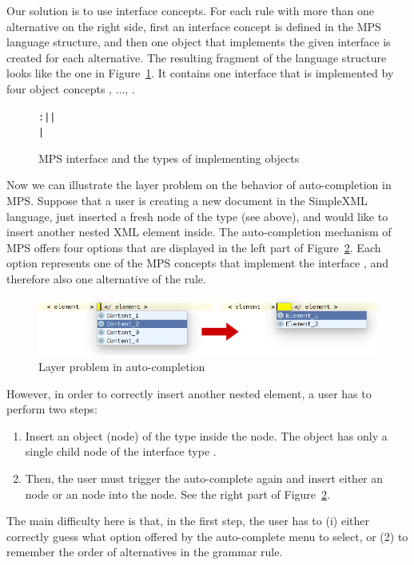 Our solution is to use interface concepts.
For each rule with more than one alternative on the right side, first an interface concept is defined in the MPS language structure, and then one object that implements the given interface is created for each alternative.
The resulting fragment of the language structure looks like the one in Figure~\ref{fig:ICONTENTITF}.
It contains one interface  that is implemented by four object concepts , $\ldots$, .

\begin{figure}[ht]
\centering
\begin{alltt}
\small
{} :  |  |
            | 
\end{alltt}
\caption{MPS interface  and the types of implementing objects}
\label{fig:ICONTENTITF}
\end{figure}

Now we can illustrate the layer problem on the behavior of auto-completion in MPS.
Suppose that a user is creating a new document in the SimpleXML language, just inserted a fresh node of the type   (see above), and would like to insert another nested XML element inside.
The auto-completion mechanism of MPS offers four options that are displayed in the left part of Figure~\ref{fig:LAYERPROBLEM}.
Each option represents one of the MPS concepts that implement the interface , and therefore also one alternative of the  rule.

\begin{figure}[ht]
	\centering
	\includegraphics[scale=0.5]{./images/layer_problem.png}
	\caption{Layer problem in auto-completion}
	\label{fig:LAYERPROBLEM}
\end{figure}

However, in order to correctly insert another nested element, a user has to perform two steps:
\begin{enumerate}
	\item Insert an object (node) of the type   inside the  node. The  object has only a single child node of the interface type .
	\item Then, the user must trigger the auto-complete again and insert either an  node or an  node into the  node. See the right part of Figure~\ref{fig:LAYERPROBLEM}.
\end{enumerate}
The main difficulty here is that, in the first step, the user has to (i) either correctly guess what option offered by the auto-complete menu to select, or (2) to remember the order of alternatives in the grammar rule.

